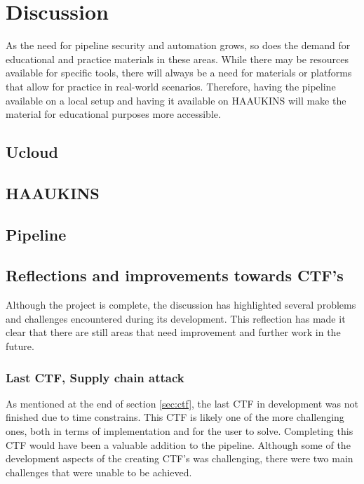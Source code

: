 \chapter{Discussion}
\label{sec:discussion}
As the need for pipeline security and automation grows, so does the demand
for educational and practice materials in these areas. While there may be
resources available for specific tools, there will always be a need for materials
or platforms that allow for practice in real-world scenarios. Therefore,
having the pipeline available on a local setup and having it available on \ac{HAAUKINS} 
will make the material for educational purposes more accessible.

\section{Ucloud}
\label{sec:discussion-ucloud}


\section{HAAUKINS}
\label{sec:discussion-haaukins}


\section{Pipeline}
\label{sec:discussion-pipeline}


\section{Reflections and improvements towards CTF's}
\label{sec:discussion-future-work}
Although the project is complete, the discussion has highlighted several problems and challenges encountered during its development. 
This reflection has made it clear that there are still areas that need improvement and further work in the future. 

\subsection{Last CTF, Supply chain attack}
As mentioned at the end of section \ref{sec:ctf}, the last CTF in development 
was not finished due to time constrains.
This CTF is likely one of the more challenging ones, both in terms of implementation and for the user to solve. 
Completing this CTF would have been a valuable addition to the pipeline.
Although some of the development aspects of the creating CTF's was challenging,
there were two main challenges that were unable to be achieved.
